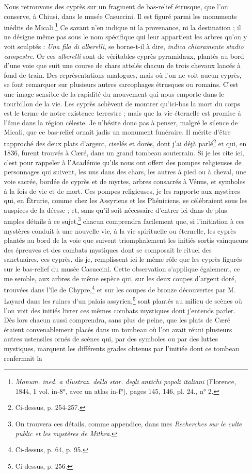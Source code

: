 \documentclass{article}
\begin{document}
Nous retrouvons des cyprès sur un fragment de bas-relief étrusque, que l'on conserve, à Chiusi, dans le musée Casuccini. Il est figuré parmi les monuments inédits de Micali.\footnote{\emph{Monum. ined. a illustraz. della stor. degli antichi popoli italiani} (Florence, 1844, 1 vol. in-8°, avec un atlas in-f°), pages 145, 146, pl. 24., n° 2.} Ce savant n'en indique ni la provenance, ni la destination ; il ne désigne même pas sous le nom spécifique qui leur appartient les arbres qu'on y voit sculptés : \emph{Una fila di alberelli}, se borne-t-il à dire, \emph{indica chiaramente stadio campestre}. Or ces \emph{alberelli} sont de véritables cyprès pyramidaux, plantés au bord d'une voie que suit une course de chars attelés chacun de trois chevaux lancés à fond de train. Des représentations analogues, mais où l'on ne voit aucun cyprès, se font remarquer sur plusieurs autres sarcophages étrusques ou romains. C'est une image sensible de la rapidité du mouvement qui nous emporte dans le tourbillon de la vie. Les cyprès achèvent de montrer qu'ici-bas la mort du corps est le terme de notre existence terrestre ; mais que la vie éternelle est promise à l'âme dans la région céleste. Je n'hésite donc pas à penser, malgré le silence de Micali, que ce bas-relief ornait jadis un monument funéraire. Il mérite d'être rapproché des deux plats d'argent, ciselés et dorés, dont j'ai déjà parlé\footnote{Ci-dessus, p. 254-257.} et qui, en 1836, furent trouvés à Cæré, dans un grand tombeau souterrain. Si je les cite ici, c'est pour rappeler à l'Académie qu'ils nous ont offert des pompes religieuses de personnages qui suivent, les uns dans des chars, les autres à pied ou à cheval, une voie sacrée, bordée de cyprès et de myrtes, arbres consacrés à Vénus, et symboles à la fois de vie et de mort. Ces pompes religieuses, je les rapporte aux mystères qui, en Étrurie, comme chez les Assyriens et les Phéniciens, se célébraient sous les auspices de la déesse ; et, sans qu'il soit nécessaire d'entrer ici dans de plus amples détails à ce sujet,\footnote{On trouvera ces détails, comme appendice, dans mes \emph{Recherches sur le culte public et les mystères de Mithra}.} chacun comprendra facilement que, si l'initiation à ces mystères conduit à une nouvelle vie, à la vie spirituelle ou éternelle, les cyprès plantés au bord de la voie que suivent triomphalement les initiés sortis vainqueurs des épreuves et des combats mystiques dont se composait le rituel des sanctuaires, ces cyprès, dis-je, remplissent ici le même rôle que les cyprès figurés sur le bas-relief du musée Casuccini. Cette observation s'applique également, ce me semble, aux arbres de même espèce qui, sur les deux coupes d'argent doré, trouvées dans l'île de Chypre,\footnote{Ci-dessus, p. 64, p. 95.} et sur les coupes de bronze découvertes par M. Layard dans les ruines d'un palais assyrien,\footnote{Ci-dessus, p. 256.} sont plantés au milieu de scènes où l'on voit des initiés livrer ces mêmes combats mystiques dont j'entends parler. Dès lors chacun aussi comprendra, sans plus de peine, que les plats de Cæré étaient convenablement placés dans un tombeau où l'on avait réuni plusieurs autres ustensiles ornés de scènes qui, par des symboles ou par des luttes mystiques, marquent les différents grades obtenus par l'initiée dont ce tombeau renfermait la 
\end{document}
